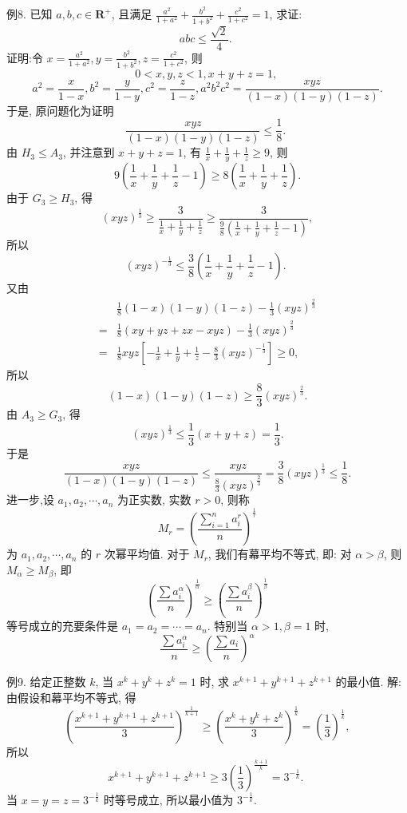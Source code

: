 例8. 已知 $a, b, c \in \mathbf{R}^{+}$, 且满足 $\frac{a^2}{1+a^2}+\frac{b^2}{1+b^2}+\frac{c^2}{1+c^2}=1$, 求证:
$$
a b c \leqslant \frac{\sqrt{2}}{4} \text {. }
$$
证明:令 $x=\frac{a^2}{1+a^2}, y=\frac{b^2}{1+b^2}, z=\frac{c^2}{1+c^2}$, 则
$$
0<x, y, z<1, x+y+z=1 \text {, }
$$
$$
a^2=\frac{x}{1-x}, b^2=\frac{y}{1-y}, c^2=\frac{z}{1-z}, a^2 b^2 c^2=\frac{x y z}{(1-x)(1-y)(1-z)} .
$$
于是, 原问题化为证明
$$
\frac{x y z}{(1-x)(1-y)(1-z)} \leqslant \frac{1}{8} \text {. }
$$
由 $H_3 \leqslant A_3$, 并注意到 $x+y+z=1$, 有 $\frac{1}{x}+\frac{1}{y}+\frac{1}{z} \geqslant 9$, 则
$$
9\left(\frac{1}{x}+\frac{1}{y}+\frac{1}{z}-1\right) \geqslant 8\left(\frac{1}{x}+\frac{1}{y}+\frac{1}{z}\right) .
$$
由于 $G_3 \geqslant H_3$, 得
$$
(x y z)^{\frac{1}{3}} \geqslant \frac{3}{\frac{1}{x}+\frac{1}{y}+\frac{1}{z}} \geqslant \frac{3}{\frac{9}{8}\left(\frac{1}{x}+\frac{1}{y}+\frac{1}{z}-1\right)},
$$
所以
$$
(x y z)^{-\frac{1}{3}} \leqslant \frac{3}{8}\left(\frac{1}{x}+\frac{1}{y}+\frac{1}{z}-1\right) \text {. }
$$
又由
$$
\begin{aligned}
& \frac{1}{8}(1-x)(1-y)(1-z)-\frac{1}{3}(x y z)^{\frac{2}{3}} \\
= & \frac{1}{8}(x y+y z+z x-x y z)-\frac{1}{3}(x y z)^{\frac{2}{3}} \\
= & \frac{1}{8} x y z\left[-\frac{1}{x}+\frac{1}{y}+\frac{1}{z}-\frac{8}{3}(x y z)^{-\frac{1}{3}}\right] \geqslant 0,
\end{aligned}
$$
所以
$$
(1-x)(1-y)(1-z) \geqslant \frac{8}{3}(x y z)^{\frac{2}{3}} .
$$
由 $A_3 \geqslant G_3$, 得
$$
(x y z)^{\frac{1}{3}} \leqslant \frac{1}{3}(x+y+z)=\frac{1}{3} .
$$
于是
$$
\frac{x y z}{(1-x)(1-y)(1-z)} \leqslant \frac{x y z}{\frac{8}{3}(x y z)^{\frac{2}{3}}}=\frac{3}{8}(x y z)^{\frac{1}{3}} \leqslant \frac{1}{8} .
$$
进一步,设 $a_1, a_2, \cdots, a_n$ 为正实数, 实数 $r>0$, 则称
$$
M_r=\left(\frac{\sum_{i=1}^n a_i^r}{n}\right)^{\frac{1}{r}}
$$
为 $a_1, a_2, \cdots, a_n$ 的 $r$ 次幂平均值.
对于 $M_r$, 我们有幕平均不等式, 即:
对 $\alpha>\beta$, 则 $M_\alpha \geqslant M_\beta$, 即
$$
\left(\frac{\sum a_i^\alpha}{n}\right)^{\frac{1}{\alpha}} \geqslant\left(\frac{\sum a_i^\beta}{n}\right)^{\frac{1}{\beta}}
$$
等号成立的充要条件是 $a_1=a_2=\cdots=a_n$.
特别当 $\alpha>1, \beta=1$ 时,
$$
\frac{\sum a_i^\alpha}{n} \geqslant\left(\frac{\sum a_i}{n}\right)^\alpha
$$



例9. 给定正整数 $k$, 当 $x^k+y^k+z^k=1$ 时, 求 $x^{k+1}+y^{k+1}+z^{k+1}$ 的最小值.
解:由假设和幕平均不等式, 得
$$
\left(\frac{x^{k+1}+y^{k+1}+z^{k+1}}{3}\right)^{\frac{1}{k+1}} \geqslant\left(\frac{x^k+y^k+z^k}{3}\right)^{\frac{1}{k}}=\left(\frac{1}{3}\right)^{\frac{1}{k}},
$$
所以
$$
x^{k+1}+y^{k+1}+z^{k+1} \geqslant 3\left(\frac{1}{3}\right)^{\frac{k+1}{k}}=3^{-\frac{1}{k}} \text {. }
$$
当 $x=y=z=3^{-\frac{1}{k}}$ 时等号成立, 所以最小值为 $3^{-\frac{1}{k}}$.



